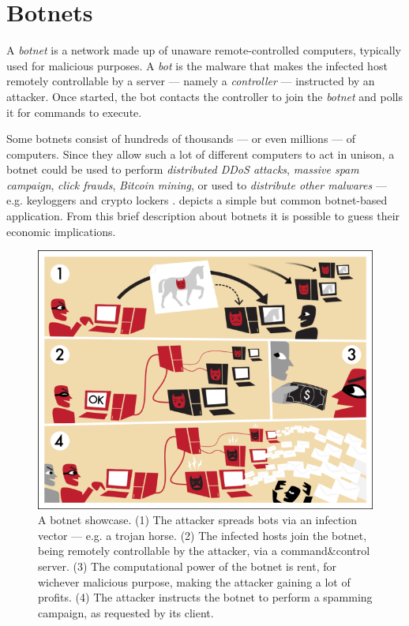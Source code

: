 \section{Botnets}
\label{sec:botnets}

A \textit{botnet} is a network made up of unaware remote-controlled computers, typically used for malicious purposes.
A \textit{bot} is the malware that makes the infected host remotely controllable by a server — namely a \textit{controller} — instructed by an attacker. Once started, the bot contacts the controller to join the \textit{botnet} and polls it for commands to execute.

Some botnets consist of hundreds of thousands — or even millions — of computers. Since they allow such a lot of different computers to act in unison, a botnet could be used to perform \textit{distributed DDoS attacks}, \textit{massive spam campaign}, \textit{click frauds}, \textit{Bitcoin mining}, or used to \textit{distribute other malwares} — e.g. keyloggers and crypto lockers \cite{anderson2008security}.  depicts a simple but common botnet-based application. From this brief description about botnets it is possible to guess their economic implications.

\begin{figure}[tp]
  \centering
  \includegraphics[scale=0.6]{./fig/botnetshowcase.png}
  \caption{A botnet showcase. (1) The attacker spreads bots via an infection vector — e.g. a trojan horse. (2) The infected hosts join the botnet, being remotely controllable by the attacker, via a command\&control server. (3) The computational power of the botnet is rent, for wichever malicious purpose, making the attacker gaining a lot of profits. (4) The attacker instructs the botnet to perform a spamming campaign, as requested by its client.}
    \label{fig:botnet-showcase}
\end{figure}

